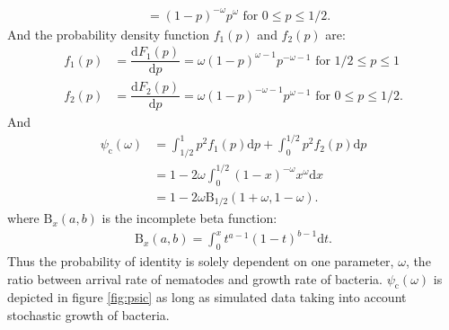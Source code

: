 \documentclass[10pt]{article}
\newcommand{\ud}{{\mathrm{d}}}
\newcommand{\psic}{\psi_\mathrm{c}}
\begin{document}
\begin{boxframe}
\begin{multicols}{2}
\begin{align}
  &= (1-p)^{-\omega} p^\omega \text{ for } 0 \leq p \leq 1/2.
  \end{align}
  And the probability density function $f_1(p)$ and $f_2(p)$ are:
  \begin{align}
  f_1(p) &= \dfrac{ \ud F_1(p) }{ \ud p} =  \omega (1-p)^{\omega-1} p^{-\omega-1}  \text{ for } 1/2 \leq p \leq 1\\
  f_2(p) &= \dfrac{ \ud F_2(p) }{ \ud p} =  \omega (1-p)^{-\omega-1} p^{\omega-1} \text{ for } 0 \leq p \leq 1/2.
  \end{align}
  And 
  \begin{align}
  \psic (\omega)&= \int_{1/2}^{1} p^2 f_1(p) \ud p + \int_{0}^{1/2} p^2 f_2(p) \ud p \\
  &= 1 -2  \omega \int_{0}^{1/2}  (1-x)^{-\omega} x^{\omega}  \ud x \\
  &= 1- 2 \omega \mathrm{B}_{1/2}(1+\omega,1-\omega). \label{eqn:star2} \tag{ $\ast \ast$ }
  \end{align}
  where $\mathrm{B}_x(a,b)$ is the incomplete beta function:
\begin{align}
\mathrm{B}_x(a,b) = \int_0^x t^{a-1}(1-t)^{b-1} \ud t.
\end{align}
  Thus the probability of identity is solely dependent on one parameter, $\omega$, the ratio between arrival rate of nematodes and growth rate of bacteria. 
  $\psic (\omega)$ is depicted in figure \ref{fig:psic} as long as simulated data taking into account stochastic growth of bacteria.
 \end{multicols}
\end{boxframe}
\end{document}
